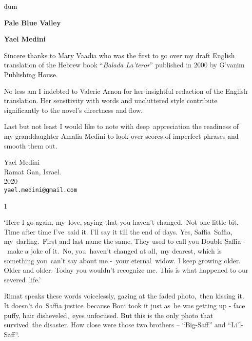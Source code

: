 \documentclass[twoside,11pt]{book}
\begin{document}
\thispagestyle{empty}
{\nullfont dum}
\vspace{.3\textheight}
\begin{center}
{\Huge \textbf{Pale Blue Valley}}

\bigskip

\textbf{\Large Yael Medini}
\end{center}
\vspace{.2\textheight}

Sincere thanks to Mary Vaadia who was the first to go over my draft
English translation of the Hebrew book ``\emph{Balada La'teror}''
published in 2000 by G'vanim Publishing House.

\bigskip
No less am I indebted to Valerie Arnon for her insightful redaction of
the English translation. Her sensitivity with words and uncluttered
style contribute significantly to the novel's directness and flow.

\bigskip
Last but not least I would like to note with deep~appreciation the
readiness of my granddaughter Amalia Medini to look over scores of
imperfect phrases and smooth them out.


\bigskip
{
\parindent=0pt
Yael Medini\\
Ramat Gan, Israel. \\
2020 \\
\texttt{yael.medini@gmail.com}
}


{1}

`Here I go again,
my\ love,{ saying that you haven't changed.\ Not one little
bit}. {Time after time I've\ said it. I'll say it
till the end of days. Yes, Saffia\ Saffia, my~darling.\ First and last name the same. }They used to call you Double
Saffia -\ make a joke of it.{\ No,
you}\textit{{\ }}{haven't
changed }at all,\ my dearest, which is something you\ {can't say about
me -}\ {your
}eternal{\ widow. I keep growing older. Older and older.
}Today{ you wouldn't recognize me. This is what happened to our
severed~life.'}

Rimat speaks these words voicelessly, gazing at the faded photo,\ then kissing it.
It{ doesn't
do\ Saffia} {justice\ because Boni took it }just
as\ he was getting up - face puffy, hair
disheveled,{\ }{eyes
unfocused. But this is the only photo that survived\ }the disaster{.
How close were those two brothers {}-- }{}``Big-Saff{}'' and {}``Li{}'l{}-Saff``. 
\end{document}
